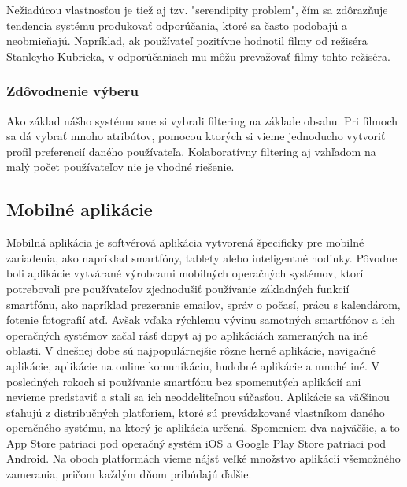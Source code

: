 Nežiadúcou vlastnosťou je tiež aj tzv. "serendipity problem", čím sa zdôrazňuje tendencia systému produkovať odporúčania, ktoré sa často podobajú a neobmieňajú. Napríklad, ak používateľ pozitívne hodnotil filmy od režiséra Stanleyho Kubricka, v odporúčaniach mu môžu prevažovať filmy tohto režiséra. \cite{rs1} \\

\subsubsection{Zdôvodnenie výberu}
Ako základ nášho systému sme si vybrali filtering na základe obsahu. Pri filmoch sa dá vybrať mnoho atribútov, pomocou ktorých si vieme jednoducho vytvoriť profil preferencií daného používateľa. Kolaboratívny filtering aj vzhľadom na malý počet používateľov nie je vhodné riešenie.

\subsection{Mobilné aplikácie}
Mobilná aplikácia je softvérová aplikácia vytvorená špecificky pre mobilné zariadenia, ako napríklad smartfóny, tablety alebo inteligentné hodinky. \cite{ma1} Pôvodne boli aplikácie vytvárané výrobcami mobilných operačných systémov, ktorí potrebovali pre používateľov zjednodušiť používanie základných funkcií smartfónu, ako napríklad prezeranie emailov, správ o počasí, prácu s kalendárom, fotenie fotografií atď. \cite{ma2} Avšak vďaka rýchlemu vývinu samotných smartfónov a ich operačných systémov začal rásť dopyt aj po aplikáciách zameraných na iné oblasti. V dnešnej dobe sú najpopulárnejšie rôzne herné aplikácie, navigačné aplikácie, aplikácie na online komunikáciu, hudobné aplikácie a mnohé iné. V posledných rokoch si používanie smartfónu bez spomenutých aplikácií ani nevieme predstaviť a stali sa ich neoddeliteľnou súčasťou. Aplikácie sa väčšinou sťahujú z distribučných platforiem, ktoré sú prevádzkované vlastníkom daného operačného systému, na ktorý je aplikácia určená. Spomeniem dva najväčšie, a to App Store patriaci pod operačný systém iOS a Google Play Store patriaci pod Android. Na oboch platformách vieme nájsť veľké množstvo aplikácií všemožného zamerania, pričom každým dňom pribúdajú ďalšie. \cite{ma1} \\
